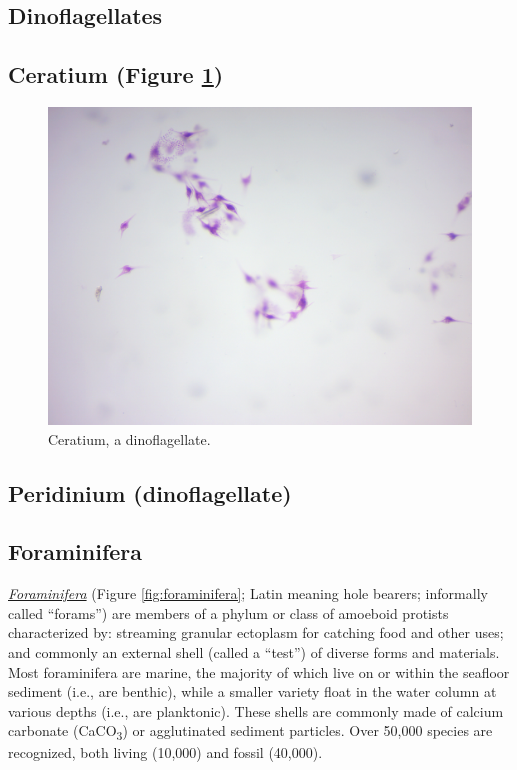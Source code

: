 \subsection{Dinoflagellates}\label{dinoflagellates}

\subsection{Ceratium (Figure
\ref{fig:ceratium})}\label{ceratium-figure-reffigceratium}

\begin{figure}

{\centering \includegraphics[width=0.7\linewidth]{./figures/protists/ceratium}

}

\caption{Ceratium, a dinoflagellate.}\label{fig:ceratium}
\end{figure}

\subsection{Peridinium
(dinoflagellate)}\label{peridinium-dinoflagellate}

\subsection{Foraminifera}\label{foraminifera}

\href{https://en.wikipedia.org/wiki/Foraminifera}{\emph{Foraminifera}}
(Figure \ref{fig:foraminifera}; Latin meaning hole bearers; informally
called ``forams'') are members of a phylum or class of amoeboid protists
characterized by: streaming granular ectoplasm for catching food and
other uses; and commonly an external shell (called a ``test'') of
diverse forms and materials. Most foraminifera are marine, the majority
of which live on or within the seafloor sediment (i.e., are benthic),
while a smaller variety float in the water column at various depths
(i.e., are planktonic). These shells are commonly made of calcium
carbonate (CaCO\textsubscript{3}) or agglutinated sediment particles.
Over 50,000 species are recognized, both living (10,000) and fossil
(40,000).

